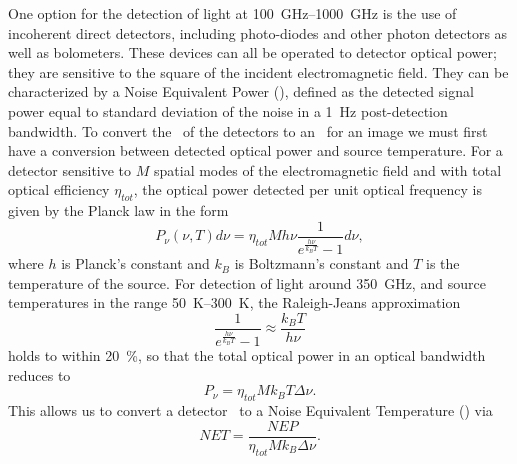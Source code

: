 One option for the detection of light at \SIrange{100}{1000}{\GHz} is the use of incoherent direct detectors, including photo-diodes and other photon detectors as well as bolometers.
These devices can all be operated to detector optical power; they are sensitive to the square of the incident electromagnetic field.
They can be characterized by a Noise Equivalent Power (\NEP), defined as the detected signal power equal to standard deviation of the noise in a \SI{1}{\Hz} post-detection bandwidth.
To convert the \NEP\ of the detectors to an \NETD\ for an image we must first have a conversion between detected optical power and source temperature.
For a detector sensitive to $M$ spatial modes of the electromagnetic field and with total optical efficiency $\eta_{tot}$, the optical power detected per unit optical frequency is given by the Planck law in the form \cite{richards_bolometers_1994}
\begin{equation} \label{eqn:ch1-planck}
  P_{\nu}(\nu,T) d \nu = \eta_{tot} M h \nu \frac{1}{e^{\frac{h \nu}{k_B T}} - 1} d \nu,
\end{equation}
where $h$ is Planck's constant and $k_B$ is Boltzmann's constant and $T$ is the temperature of the source.
For detection of light around \SI{350}{\GHz}, and source temperatures in the range \SIrange{50}{300}{\K}, the Raleigh-Jeans approximation
\begin{equation}
  \frac{1}{e^{\frac{h \nu}{k_B T}} - 1} \approx \frac{k_B T}{h \nu}
\end{equation}
holds to within \SI{20}{\percent}, so that the total optical power in an optical bandwidth reduces to 
\begin{equation}
  P_{\nu} = \eta_{tot} M k_B T \Delta \nu.
\end{equation}
This allows us to convert a detector \NEP\ to a Noise Equivalent Temperature (\NET) via
\begin{equation}
  NET = \frac{NEP}{\eta_{tot} M k_B \Delta \nu}.
\end{equation}

